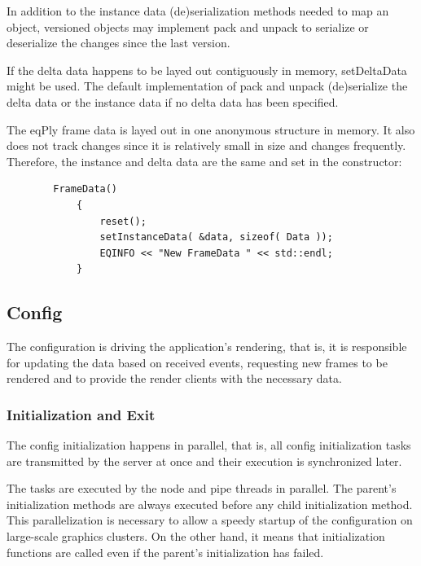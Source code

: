 \documentclass[10pt,a4]{scrartcl}
\begin{document}
In addition to the instance data (de)serialization methods needed to map
an object, versioned objects may implement \textsf{pack} and
\textsf{unpack} to serialize or deserialize the changes since the last
version.

If the delta data happens to be layed out contiguously in memory,
\textsf{setDeltaData} might be used. The default implementation of
\textsf{pack} and \textsf{unpack} (de)serialize the delta data or the
instance data if no delta data has been specified.

The \textsf{eqPly} frame data is layed out in one anonymous structure in
memory. It also does not track changes since it is relatively small in
size and changes frequently. Therefore, the instance and delta data are
the same and set in the constructor:

{\footnotesize\begin{lstlisting}
        FrameData()
            {
                reset();
                setInstanceData( &data, sizeof( Data ));
                EQINFO << "New FrameData " << std::endl;
            }
\end{lstlisting}}%

\subsection{Config}

The configuration is driving the application's rendering, that is, it is
responsible for updating the data based on received events, requesting
new frames to be rendered and to provide the render clients with the
necessary data.

\subsubsection{Initialization and Exit}

The config initialization happens in parallel, that is, all config
initialization tasks are transmitted by the server at once and their
execution is synchronized later. 

The tasks are executed by the node and pipe threads in parallel. The
parent's initialization methods are always executed before any child
initialization method. This parallelization is necessary to allow a
speedy startup of the configuration on large-scale graphics clusters. On
the other hand, it means that initialization functions are called even
if the parent's initialization has failed.
\end{document}
